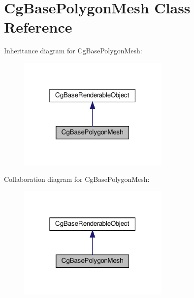 \hypertarget{class_cg_base_polygon_mesh}{}\section{Cg\+Base\+Polygon\+Mesh Class Reference}
\label{class_cg_base_polygon_mesh}


Inheritance diagram for Cg\+Base\+Polygon\+Mesh\+:
\nopagebreak
\begin{figure}[H]
\begin{center}
\leavevmode
\includegraphics[width=210pt]{class_cg_base_polygon_mesh__inherit__graph}
\end{center}
\end{figure}


Collaboration diagram for Cg\+Base\+Polygon\+Mesh\+:
\nopagebreak
\begin{figure}[H]
\begin{center}
\leavevmode
\includegraphics[width=210pt]{class_cg_base_polygon_mesh__coll__graph}
\end{center}
\end{figure}
